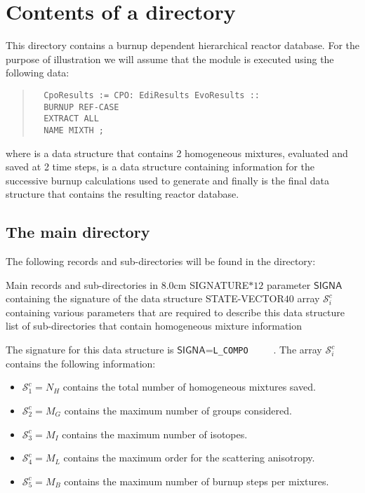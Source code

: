 \section{Contents of a  directory}\label{sect:cpodir}

This directory contains a burnup dependent hierarchical reactor database. For the purpose of illustration we
will assume that the  module is executed using the following data:
\begin{quote}
\begin{verbatim}
  CpoResults := CPO: EdiResults EvoResults ::
  BURNUP REF-CASE
  EXTRACT ALL
  NAME MIXTH ;
\end{verbatim}
\end{quote}
 where  is a  data structure that contains 2 homogeneous mixtures,
evaluated and saved at 2 time steps,  is a  data structure containing information
for the successive burnup calculations used to generate  and finally  is the
final  data structure that contains the resulting reactor database.  

\subsection{The main directory}\label{sect:cpodirmain}

The following records and sub-directories will be found in the  directory:

\begin{DescriptionEnregistrement}{Main records and sub-directories in }{8.0cm}
\CharEnr
  {SIGNATURE}{$*12$}
   {parameter $\mathsf{SIGNA}$ containing the signature of the data structure}
\IntEnr
  {STATE-VECTOR}{$40$}
  {array $\mathcal{S}^{c}_{i}$ containing various parameters that are required to describe this data
structure}
\DirVar
  {}
  {list of sub-directories that contain homogeneous mixture information}
\end{DescriptionEnregistrement}

The signature for this data structure is $\mathsf{SIGNA}$=\verb*|L_COMPO     |. The array
$\mathcal{S}^{c}_{i}$ contains the following information:

\begin{itemize}
\item $\mathcal{S}^{c}_{1}=N_{H}$ contains the total number of homogeneous mixtures saved. 
\item $\mathcal{S}^{c}_{2}=M_{G}$ contains the maximum number of groups considered. 
\item $\mathcal{S}^{c}_{3}=M_{I}$ contains the maximum number of isotopes.
\item $\mathcal{S}^{c}_{4}=M_{L}$ contains the maximum order for the scattering anisotropy.
\item $\mathcal{S}^{c}_{5}=M_{B}$ contains the maximum number of burnup steps per mixtures. 
\end{itemize}

